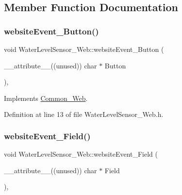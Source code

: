 \subsection{Member Function Documentation}
\mbox{\label{class_water_level_sensor___web_af70800c309eaf938c8974f71a9c2d0e2}} 
\subsubsection{\texorpdfstring{website\+Event\+\_\+\+Button()}{websiteEvent\_Button()}}
{\footnotesize\ttfamily void Water\+Level\+Sensor\+\_\+\+Web\+::website\+Event\+\_\+\+Button (\begin{DoxyParamCaption}\item[{\+\_\+\+\_\+attribute\+\_\+\+\_\+((unused)) char $\ast$}]{Button }\end{DoxyParamCaption})\hspace{0.3cm}{\ttfamily [inline]}, {\ttfamily [virtual]}}



Implements \hyperlink{class_common___web_acd10f27b30f3111277b4730ee5495090}{Common\+\_\+\+Web}.



Definition at line 13 of file Water\+Level\+Sensor\+\_\+\+Web.\+h.

\mbox{\label{class_water_level_sensor___web_a4cce09a705011d6bdf685b5f2d3d771c}} 
\subsubsection{\texorpdfstring{website\+Event\+\_\+\+Field()}{websiteEvent\_Field()}}
{\footnotesize\ttfamily void Water\+Level\+Sensor\+\_\+\+Web\+::website\+Event\+\_\+\+Field (\begin{DoxyParamCaption}\item[{\+\_\+\+\_\+attribute\+\_\+\+\_\+((unused)) char $\ast$}]{Field }\end{DoxyParamCaption})\hspace{0.3cm}{\ttfamily [inline]}, {\ttfamily [virtual]}}



